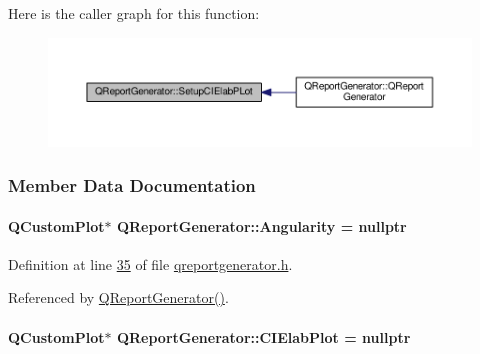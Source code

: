 Here is the caller graph for this function\+:
\nopagebreak
\begin{figure}[H]
\begin{center}
\leavevmode
\includegraphics[width=350pt]{class_q_report_generator_a828ae557a03162a08d13f94f2d1888f4_icgraph}
\end{center}
\end{figure}




\subsubsection{Member Data Documentation}
\hypertarget{class_q_report_generator_a8c2f9aee54d302f1330c6fd60d12bd13}{}
\paragraph[{Angularity}]{\setlength{\rightskip}{0pt plus 5cm}Q\+Custom\+Plot$\ast$ Q\+Report\+Generator\+::\+Angularity = nullptr}\label{class_q_report_generator_a8c2f9aee54d302f1330c6fd60d12bd13}


Definition at line \hyperlink{qreportgenerator_8h_source_l00035}{35} of file \hyperlink{qreportgenerator_8h_source}{qreportgenerator.\+h}.



Referenced by \hyperlink{qreportgenerator_8cpp_source_l00004}{Q\+Report\+Generator()}.

\hypertarget{class_q_report_generator_a1a727308ea8cb98523a308d10da70b39}{}
\paragraph[{C\+I\+Elab\+Plot}]{\setlength{\rightskip}{0pt plus 5cm}Q\+Custom\+Plot$\ast$ Q\+Report\+Generator\+::\+C\+I\+Elab\+Plot = nullptr\hspace{0.3cm}{\ttfamily [private]}}\label{class_q_report_generator_a1a727308ea8cb98523a308d10da70b39}


